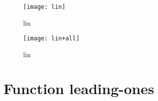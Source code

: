 \begin{center}
\begin{figure}[h]
\centering
\texttt{[image: lin]}
\caption{lin}
\end{figure}
\end{center}

\begin{center}
\begin{figure}[h]
\centering
\texttt{[image: lin+all]}
\caption{lin}
\end{figure}
\end{center}

\newpage

\section{Function leading-ones}
